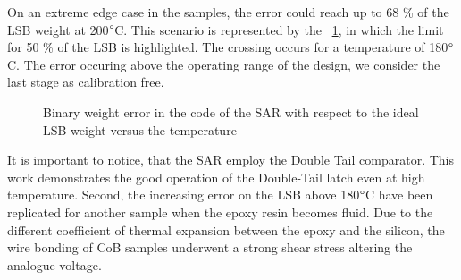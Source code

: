 On an extreme edge case in the samples, the error could reach up to 68 \% of the LSB weight at 200$\degree$C. This scenario is represented by the \figurename~\ref{fig:sar-test-coef_doe05_13}, in which the limit for 50 \% of the LSB is highlighted. The crossing occurs for a temperature of 180$\degree$C. The error occuring above the operating range of the design, we consider the last stage as calibration free.

\begin{figure}[htp]
    \centering
    
    \caption{Binary weight error in the code of the SAR with respect to the ideal LSB weight versus the temperature}
    \label{fig:sar-test-coef_doe05_13}
\end{figure}

It is important to notice, that the SAR employ the Double Tail comparator. This work demonstrates the good operation of the Double-Tail latch even at high temperature. Second, the increasing error on the LSB above 180$\degree$C have been replicated for another sample when the epoxy resin becomes fluid. Due to the different coefficient of thermal expansion between the epoxy and the silicon, the wire bonding of CoB samples underwent a strong shear stress altering the analogue voltage.
